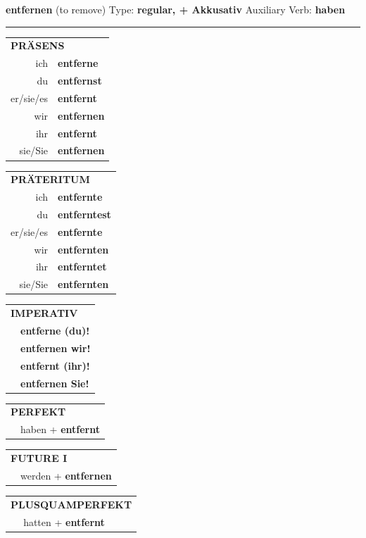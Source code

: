 \documentclass[10pt,a4paper]{revtex4-2}
\begin{document}
\begin{verbbox-acc}
{\Large \bf entfernen} (to remove) \hfill Type: \textbf{regular, + Akkusativ} \hfill Auxiliary Verb: \textbf{haben}

\vspace{5pt}
\hrule
\vspace{5pt}

\begin{tabular}{rl}
\multicolumn{2}{l}{\textbf{PRÄSENS}}\\
ich & \textbf{entferne}\\
du & \textbf{entfernst}\\
er/sie/es & \textbf{entfernt}\\
wir & \textbf{entfernen}\\
ihr & \textbf{entfernt}\\
sie/Sie & \textbf{entfernen}\\
\end{tabular}
\hfill
\begin{tabular}{rl}
\multicolumn{2}{l}{\textbf{PRÄTERITUM}}\\
ich & \textbf{entfernte}\\
du & \textbf{entferntest}\\
er/sie/es & \textbf{entfernte}\\
wir & \textbf{entfernten}\\
ihr & \textbf{entferntet}\\
sie/Sie & \textbf{entfernten}\\
\end{tabular}
\hfill
\begin{tabular}{rl}
\multicolumn{2}{l}{\textbf{IMPERATIV}}\\
& \textbf{entferne (du)!}\\
& \textbf{entfernen wir!}\\
& \textbf{entfernt (ihr)!}\\
& \textbf{entfernen Sie!}\\
\end{tabular}

\vspace{10pt}

\begin{tabular}{rl}
\multicolumn{2}{l}{\textbf{PERFEKT}}\\
& haben + \textbf{entfernt}\\
\end{tabular}
\hfill
\begin{tabular}{rl}
\multicolumn{2}{l}{\textbf{FUTURE I}}\\
& werden + \textbf{entfernen}\\
\end{tabular}
\hfill
\begin{tabular}{rl}
\multicolumn{2}{l}{\textbf{PLUSQUAMPERFEKT}}\\
& hatten + \textbf{entfernt}\\
\end{tabular}


\end{verbbox-acc}
\end{document}
